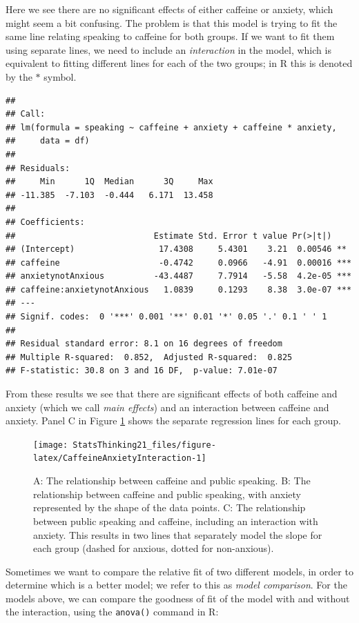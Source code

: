\documentclass[12pt,]{book}
\theoremstyle{definition}
\theoremstyle{definition}
\theoremstyle{definition}
\theoremstyle{remark}
\begin{document}
Here we see there are no significant effects of either caffeine or anxiety, which might seem a bit confusing. The problem is that this model is trying to fit the same line relating speaking to caffeine for both groups. If we want to fit them using separate lines, we need to include an \emph{interaction} in the model, which is equivalent to fitting different lines for each of the two groups; in R this is denoted by the \(*\) symbol.

\begin{verbatim}
## 
## Call:
## lm(formula = speaking ~ caffeine + anxiety + caffeine * anxiety, 
##     data = df)
## 
## Residuals:
##     Min      1Q  Median      3Q     Max 
## -11.385  -7.103  -0.444   6.171  13.458 
## 
## Coefficients:
##                            Estimate Std. Error t value Pr(>|t|)    
## (Intercept)                 17.4308     5.4301    3.21  0.00546 ** 
## caffeine                    -0.4742     0.0966   -4.91  0.00016 ***
## anxietynotAnxious          -43.4487     7.7914   -5.58  4.2e-05 ***
## caffeine:anxietynotAnxious   1.0839     0.1293    8.38  3.0e-07 ***
## ---
## Signif. codes:  0 '***' 0.001 '**' 0.01 '*' 0.05 '.' 0.1 ' ' 1
## 
## Residual standard error: 8.1 on 16 degrees of freedom
## Multiple R-squared:  0.852,  Adjusted R-squared:  0.825 
## F-statistic: 30.8 on 3 and 16 DF,  p-value: 7.01e-07
\end{verbatim}

From these results we see that there are significant effects of both caffeine and anxiety (which we call \emph{main effects}) and an interaction between caffeine and anxiety. Panel C in Figure \ref{fig:CaffeineAnxietyInteraction} shows the separate regression lines for each group.

\begin{figure}
\texttt{[image: StatsThinking21\_files/figure-latex/CaffeineAnxietyInteraction-1]} \caption{A: The relationship between caffeine and public speaking. B: The relationship between caffeine and public speaking, with anxiety represented by the shape of the data points. C: The relationship between public speaking and caffeine, including an interaction with anxiety.  This results in two lines that separately model the slope for each group (dashed for anxious, dotted for non-anxious).}\label{fig:CaffeineAnxietyInteraction}
\end{figure}

Sometimes we want to compare the relative fit of two different models, in order to determine which is a better model; we refer to this as \emph{model comparison}. For the models above, we can compare the goodness of fit of the model with and without the interaction, using the \texttt{anova()} command in R:
\end{document}
